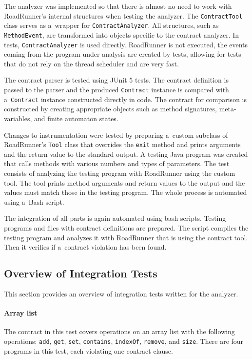 The analyzer was implemented so that there is almost no need to work with
RoadRunner's internal structures when testing the analyzer. The
\texttt{ContractTool} class serves as a~wrapper for \texttt{ContractAnalyzer}.
All structures, such as \texttt{MethodEvent}, are transformed into objects
specific to the contract analyzer. In tests, \texttt{ContractAnalyzer} is used
directly. RoadRunner is not executed, the events coming from the program under
analysis are created by tests, allowing for tests that do not rely on the
thread scheduler and are very fast.

The contract parser is tested using JUnit 5 tests. The contract definition is
passed to the parser and the produced \texttt{Contract} instance is compared
with a~\texttt{Contract} instance constructed directly in code. The contract for
comparison is constructed by creating appropriate objects such as method
signatures, meta-variables, and finite automaton states.

Changes to instrumentation were tested by preparing a~custom subclass of
RoadRunner's \texttt{Tool} class that overrides the \texttt{exit} method and
prints arguments and the return value to the standard output. A testing Java
program was created that calls methods with various numbers and types of
parameters. The test consists of analyzing the testing program with RoadRunner
using the custom tool. The tool prints method arguments and return values to the
output and the values must match those in the testing program. The whole process
is automated using a~Bash script.

The integration of all parts is again automated using bash scripts. Testing
programs and files with contract definitions are prepared. The script compiles
the testing program and analyzes it with RoadRunner that is using the contract
tool. Then it verifies if a~contract violation has been found.

\subsection{Overview of Integration Tests}
This section provides an overview of integration tests written for the analyzer.

\paragraph{Array list}
The contract in this test covers operations on an array list with the following
operations: \texttt{add}, \texttt{get}, \texttt{set}, \texttt{contains},
\texttt{indexOf}, \texttt{remove}, and \texttt{size}. There are four programs in
this test, each violating one contract clause.

